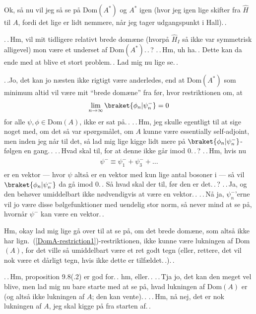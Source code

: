\documentclass{report}
\begin{document}
Ok, så nu vil jeg så se på $\mathrm{Dom}(A^*)$ og $A^*$ igen (hvor jeg igen lige skifter fra $\hat H$ til $A$, fordi det lige er lidt nemmere, når jeg tager udgangspunkt i Hall).\,. 

.\,.\,Hm, vil mit tidligere relativt brede domæne (hvorpå $\hat H_I$ så ikke var symmetrisk alligevel) mon være et underset af $\mathrm{Dom}(A^*)$.\,.\,? .\,.\,Hm, uh ha.\,. Dette kan da ende med at blive et stort problem.\,. Lad mig nu lige se.\,. 

.\,.Jo, det kan jo næsten ikke rigtigt være anderledes, end at $\mathrm{Dom}(A^*)$ som minimum altid vil være mit ``brede domæne'' fra før, hvor restriktionen om, at 
\begin{align}
\begin{aligned}
	\lim_{n\to\infty}\braket{\phi_n| \psi_n^-} = 0
	\label{DomA-restriction1}
\end{aligned}
\end{align}
for alle $\psi, \phi \in \mathrm{Dom}(A)$, ikke er sat på.\,. .\,.\,Hm, jeg skulle egentligt til at sige noget med, om det så var spørgsmålet, om $A$ kunne være essentially self-adjoint, men inden jeg når til det, så lad mig lige kigge lidt mere på $\braket{\phi_n| \psi_n^-}$-følgen en gang.\,. .\,.\,Hvad skal til, for at denne ikke går imod 0.\,.\,? .\,.\,Hm, hvis nu 
\begin{align}
\begin{aligned}
	\psi^- \equiv \psi_1^- + \psi_3^- + \ldots
\end{aligned}
\end{align}
er en vektor --- hvor $\psi$ altså er en vektor med kun lige antal bosoner i --- så vil $\braket{\phi_n| \psi_n^-}$ da gå imod 0.\,. Så hvad skal der til, før den er det.\,.\,? .\,.\,Ja, og den behøver umiddelbart ikke nødvendigvis at være en vektor.\,. .\,.\,Nå ja, $\psi_n^-$'erne vil jo være disse bølgefunktioner med uendelig stor norm, så never mind at se på, hvornår $\psi^-$ kan være en vektor.\,. 

Hm, okay lad mig lige gå over til at se på, om det brede domæne, som altså ikke har lign.\ (\ref{DomA-restriction1})-restriktionen, ikke kunne være lukningen af Dom$(A)$, for det ville så umiddelbart være et ret godt tegn (eller, rettere, det vil nok være et dårligt tegn, hvis ikke dette er tilfældet.\,.).\,.

.\,.\,Hm, proposition 9.8(.2) er god for.\,. hm, eller.\,. .\,.\,Tja jo, det kan den meget vel blive, men lad mig nu bare starte med at se på, hvad lukningen af Dom$(A)$ er (og altså ikke lukningen af $A$; den kan vente).\,. .\,.\,Hm, nå nej, det er nok lukningen af $A$, jeg skal kigge på fra starten af.\,. 
\end{document}
